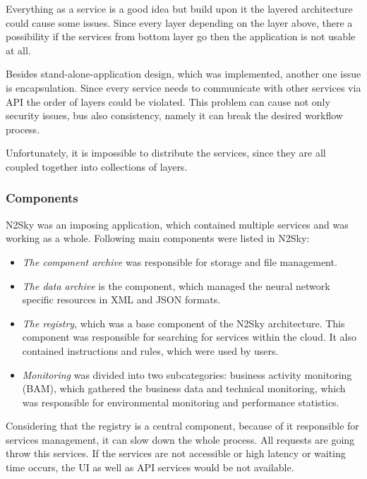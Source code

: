 Everything as a service is a good idea but build upon it the layered architecture could cause some issues. Since every layer depending on the layer above, there a possibility if the services from bottom layer go then the application is not usable at all. 

Besides stand-alone-application design, which was implemented, another one issue is encapsulation. Since every service needs to communicate with other services via API the order of layers could be violated. This problem can cause not only security issues, bus also consistency, namely it can break the desired workflow process.

Unfortunately, it is impossible to distribute the services, since they are all coupled together into collections of layers.  

\subsubsection{Components}\label{Components}

N2Sky was an imposing application, which contained multiple services and was working as a whole. Following main components were listed in N2Sky:

\begin{itemize}
\item \emph{The component archive} was responsible for storage and file management.
\item \emph{The data archive} is the component, which managed the neural network specific resources in XML and JSON formats. 
\item \emph{The registry}, which was a base component of the N2Sky architecture. This component was responsible for searching for services within the cloud.  It also contained instructions and rules, which were used by users. 
\item \emph{Monitoring} was divided into two subcategories: business activity monitoring (BAM), which gathered the business data and technical monitoring, which was responsible for environmental monitoring and performance statistics. 
\end{itemize}

Considering that the registry is a central component, because of it responsible for services management, it can slow down the whole process. All requests are going throw this services. If the services are not accessible or high latency or waiting time occurs, the UI as well as API services would be not available.

